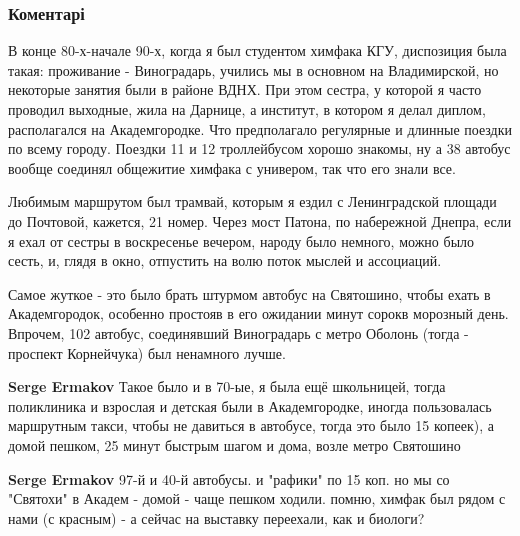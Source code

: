  
 
 
 
 
\subsubsection{Коментарі}
\label{sec:06_12_2021.fb.fb_group.story_kiev_ua.1.dorogi_kotoryje_my_vybirajem.cmt}

\begin{itemize} %

В конце 80-х-начале 90-х, когда я был студентом химфака КГУ, диспозиция была
такая: проживание - Виноградарь, учились мы в основном на Владимирской, но
некоторые занятия были в районе ВДНХ. При этом сестра, у которой я часто
проводил выходные, жила на Дарнице, а институт, в котором я делал диплом,
располагался на Академгородке. Что предполагало регулярные и длинные поездки по
всему городу. Поездки 11 и 12 троллейбусом хорошо знакомы, ну а 38 автобус
вообще соединял общежитие химфака с универом, так что его знали все.

Любимым маршрутом был трамвай, которым я ездил с Ленинградской площади до
Почтовой, кажется, 21 номер. Через мост Патона, по набережной Днепра, если я
ехал от сестры в воскресенье вечером, народу было немного, можно было сесть, и,
глядя в окно, отпустить на волю поток мыслей и ассоциаций.

Самое жуткое - это было брать штурмом автобус на Святошино, чтобы ехать в
Академгородок, особенно простояв в его ожидании минут сорокв морозный день.
Впрочем, 102 автобус, соединявший Виноградарь с метро Оболонь (тогда - проспект
Корнейчука) был ненамного лучше.

\begin{itemize} %
\textbf{Serge Ermakov} Такое было и в 70-ые, я была ещё школьницей, тогда поликлиника и взрослая и детская были в Академгородке, иногда пользовалась маршрутным такси, чтобы не давиться в автобусе, тогда это было 15 копеек), а домой пешком, 25 минут быстрым шагом и дома, возле метро Святошино

\textbf{Serge Ermakov} 97-й и 40-й автобусы. и "рафики" по 15 коп. но мы со "Святохи" в Академ - домой - чаще пешком ходили. помню, химфак был рядом с нами (с красным) - а сейчас на выставку переехали, как и биологи?


\end{itemize}
\end{itemize}
